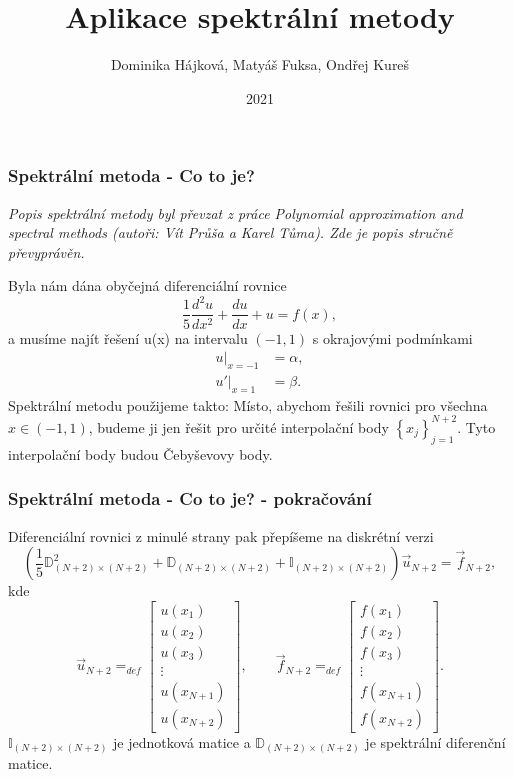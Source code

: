 \documentclass[xcolor=table]{beamer}
\title{Aplikace spektrální metody}
\author{Dominika Hájková, Matyáš Fuksa, Ondřej Kureš}
\institute{Stormtrooperz}
\date{2021}
\begin{document}
\frame{\titlepage}
\begin{frame}
\frametitle{Spektrální metoda - Co to je?}
\textit{Popis spektrální metody byl převzat z práce Polynomial approximation and spectral methods (autoři: Vít Průša a Karel Tůma). Zde je popis stručně převyprávěn.}
\pause

Byla nám dána obyčejná diferenciální rovnice
\pause
\begin{equation*}
\frac{1}{5}\frac{d^2u}{dx^2}+\frac{du}{dx}+u=f(x),
\end{equation*}
\pause
a musíme najít řešení u(x) na intervalu $(-1,1)$ s okrajovými podmínkami
\begin{align*}
\left. u \right|_{x=-1} &= \alpha, \\
\left. u' \right|_{x=1} &= \beta.
\end{align*}
\pause
Spektrální metodu použijeme takto: Místo, abychom řešili rovnici pro všechna $x \in (-1,1)$, budeme ji jen řešit pro určité interpolační body $\left\{ x_j \right\}_{j=1}^{N+2}$. Tyto interpolační body budou Čebyševovy body. 
\end{frame}

\begin{frame}
\frametitle{Spektrální metoda - Co to je? - pokračování}
Diferenciální rovnici z minulé strany pak přepíšeme na diskrétní verzi
\begin{equation*}
  \left(
    \frac{1}{5}
    \mathbb{D}_{\left(N + 2\right)\times \left(N + 2\right)}^2
    +
    \mathbb{D}_{\left(N + 2\right)\times \left(N + 2\right)}
    +
    \mathbb{I}_{\left(N + 2\right) \times \left(N + 2\right)}
  \right)
  \vec{u}_{N + 2}
  =
  \vec{f}_{N + 2}
  ,
\end{equation*}
\pause
kde
\begin{equation*}
  \vec{u}_{N + 2}
  =_{def}
  \begin{bmatrix}
    u(x_1) \\
    u(x_2) \\
    u(x_3) \\
    \vdots \\
    u(x_{N + 1}) \\
    u(x_{N + 2})
  \end{bmatrix}
  ,
  \qquad
  \vec{f}_{N + 2} = _{def}
  \begin{bmatrix}
    f(x_1) \\
    f(x_2) \\
    f(x_3) \\
    \vdots \\
    f(x_{N + 1}) \\
    f(x_{N + 2})
  \end{bmatrix}.
\end{equation*}
$\mathbb{I}_{\left(N + 2\right) \times \left(N + 2\right)}$ je jednotková matice a $\mathbb{D}_{\left(N + 2\right)\times \left(N + 2\right)}$ je spektrální diferenční matice.
\end{frame}
\end{document}
